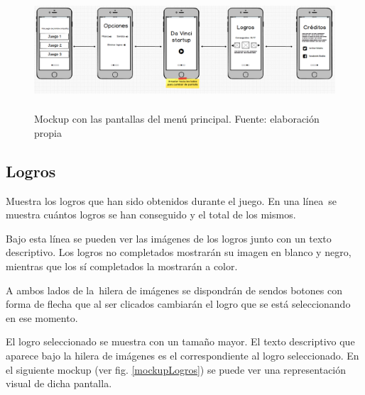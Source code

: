 \begin{figure}
    \begin{center}
\includegraphics[width=5.90556in,height=1.73542in]{anexos/GDD/GDD-img002.png}
    \caption{Mockup con las pantallas del menú principal. Fuente: elaboración propia}
    \label{allMenuImage}
    \end{center}
    
\end{figure}


\subsection[Logros]{ Logros}
\hypertarget{Toc484614217}{}{
Muestra los logros que han sido obtenidos durante el juego. En una l\'inea\ se muestra cu\'antos logros se han
conseguido y el total de los mismos.\ }

{
Bajo esta l\'inea se pueden ver las im\'agenes de los logros junto con un texto descriptivo. Los logros no completados
mostrar\'an su imagen en blanco y negro, mientras que los s\'i completados la mostrar\'an a color.\ }

{
A ambos lados de la\ hilera de im\'agenes se dispondr\'an de sendos botones con forma de flecha que al ser clicados
cambiar\'an el logro que se est\'a seleccionando en ese momento.}

{
El logro seleccionado se muestra con un tama\~no mayor. El texto descriptivo que aparece bajo la hilera de im\'agenes es
el correspondiente al logro seleccionado. En el siguiente mockup (ver fig. \ref{mockupLogros}) se puede ver una representaci\'on visual de dicha pantalla.\ }

